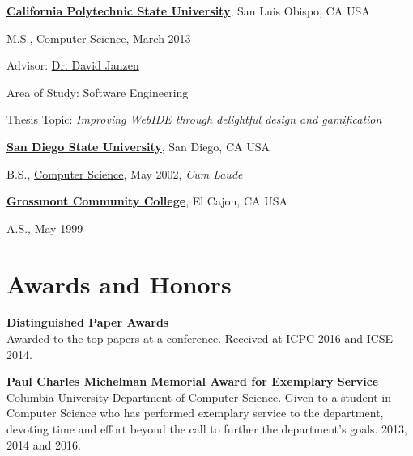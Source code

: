\documentclass[10pt]{article}
\begin{document}
        
\href{http://www.calpoly.edu/}{\textbf{California Polytechnic State University}},
San Luis Obispo, CA USA
\begin{outerlist}
\item[] M.S.,
		\vspace{-.2\baselineskip}
        \href{https://www.csc.calpoly.edu/}
             {Computer Science}, March 2013
              \begin{innerlist}
             \item Advisor:
              \href{https://users.csc.calpoly.edu/~djanzen/}
                   {Dr. David Janzen} 
        \item Area of Study: Software Engineering 
        \item Thesis Topic: \emph{Improving WebIDE through delightful design and gamification}
        \end{innerlist}
              
\end{outerlist}
\vspace{.5\baselineskip}

\href{https://www.sdsu.edu/}{\textbf{San Diego State University}},
San Diego, CA USA
\begin{outerlist}

\item[] B.S.,
        \href{www.cs.sdsu.edu/}
             {Computer Science}, May 2002, \emph{Cum Laude}
\end{outerlist}
\vspace{.5\baselineskip}


\href{http://www.grossmont.edu/}{\textbf{Grossmont Community College}},
El Cajon, CA USA
\begin{outerlist}

\item[] A.S.,
        \href{http://www.grossmont.edu/}
             May 1999
\end{outerlist}

\section{Awards and Honors}
\textbf{Distinguished Paper Awards}\\
Awarded to the top papers at a conference. Received at ICPC 2016 and ICSE 2014.

\textbf{Paul Charles Michelman Memorial Award for Exemplary Service}  \\
Columbia University Department of Computer Science. Given to a student in Computer Science who has performed exemplary service to the department, devoting time and effort beyond the call to further the department's goals. 2013, 2014 and 2016.
\end{document}
